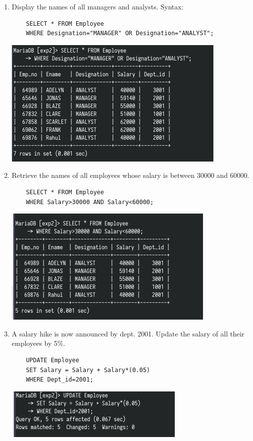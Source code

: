 \documentclass[13pt,oneside]{book}
\begin{document}
\begin{enumerate}
		\item
		Display the names of all managers and analysts.
	Syntax:
		\begin{verbatim}
	SELECT * FROM Employee
	WHERE Designation="MANAGER" OR Designation="ANALYST";
		\end{verbatim}
		\includegraphics[]{img/p2/ss9.png}
		
			\item
	Retrieve the names of all employees whose salary is between 30000
	and 60000.
		\begin{verbatim}
	SELECT * FROM Employee
	WHERE Salary>30000 AND Salary<60000;
		\end{verbatim}
		\includegraphics[]{img/p2/ss10.png}
		
			\item
	A salary hike is now announced by dept. 2001. Update the salary of all
	their employees by 5\%.
	
		\begin{verbatim}
	UPDATE Employee
	SET Salary = Salary + Salary*(0.05)
	WHERE Dept_id=2001;
		\end{verbatim}
		\includegraphics[]{img/p2/ss11.png}
		

\end{enumerate}
\end{document}
